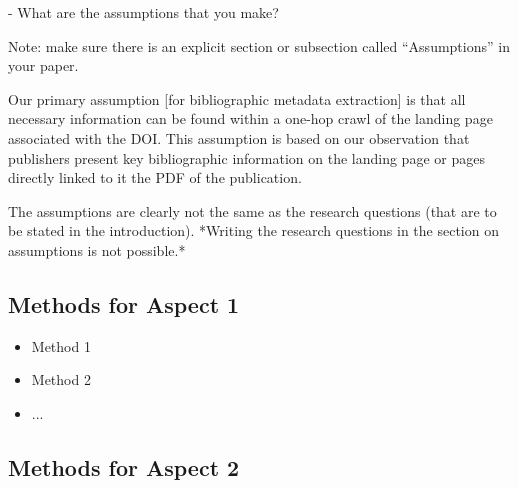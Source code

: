 \documentclass[sigconf, nonacm]{acmart}
\begin{document}
- What are the assumptions that you make?

Note: make sure there is an explicit section or subsection called ``Assumptions'' in your paper.

\begin{tcolorbox}
[title=Example: A textbook example of what an assumption is]
Our primary assumption [for bibliographic metadata extraction] is that all necessary information can be found within a one-hop crawl of the landing page associated with the DOI. This assumption is based on our observation that publishers present key bibliographic information on the landing page or pages directly linked to it \eg the PDF of the publication.
\end{tcolorbox}


\begin{tcolorbox}
[title=Assumptions: Difference to research questions.]
The assumptions are clearly not the same as the research questions (that are to be stated in the introduction). *Writing the research questions in the section on assumptions is not possible.* 
\end{tcolorbox}



\subsection{Methods for Aspect 1}


\begin{itemize}
    \item Method 1
    \item Method 2
    \item ...
\end{itemize}

\subsection{Methods for Aspect 2}
\end{document}
